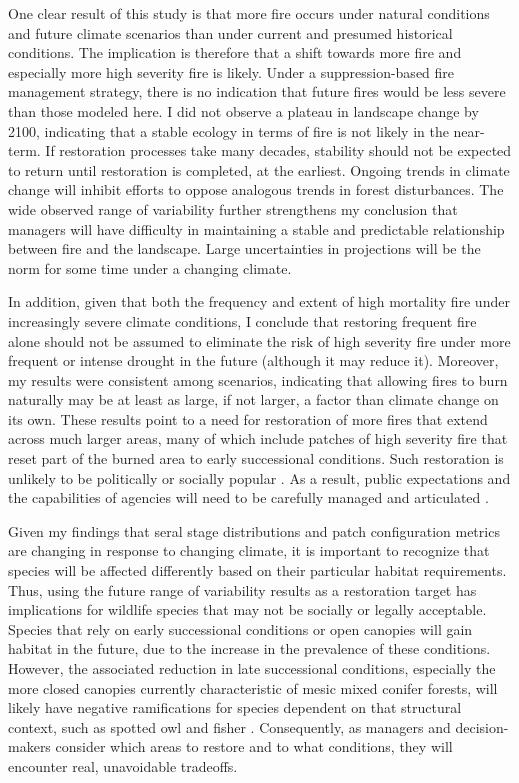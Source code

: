 One clear result of this study is that more fire occurs under natural conditions and future climate scenarios than under current and presumed historical conditions. The implication is therefore that a shift towards more fire and especially more high severity fire is likely. Under a suppression-based fire management strategy, there is no indication that future fires would be less severe than those modeled here. I did not observe a plateau in landscape change by 2100, indicating that a stable ecology in terms of fire is not likely in the near-term. If restoration processes take many decades, stability should not be expected to return until restoration is completed, at the earliest. Ongoing trends in climate change will inhibit efforts to oppose analogous trends in forest disturbances. The wide observed range of variability further strengthens my conclusion that managers will have difficulty in maintaining a stable and predictable relationship between fire and the landscape. Large uncertainties in projections will be the norm for some time under a changing climate. 

In addition, given that both the frequency and extent of high mortality fire under increasingly severe climate conditions, I conclude that restoring frequent fire alone should not be assumed to eliminate the risk of high severity fire under more frequent or intense drought in the future (although it may reduce it). Moreover, my results were consistent among scenarios, indicating that allowing fires to burn naturally may be at least as large, if not larger, a factor than climate change on its own. These results point to a need for restoration of more fires that extend across much larger areas, many of which include patches of high severity fire that reset part of the burned area to early successional conditions. Such restoration is unlikely to be politically or socially popular \citep{Stephens2010,Stephens2013}. As a result, public expectations and the capabilities of agencies will need to be carefully managed and articulated \citep{Keeley2000}. 

Given my findings that seral stage distributions and patch configuration metrics are changing in response to changing climate, it is important to recognize that species will be affected differently based on their particular habitat requirements. Thus, using the future range of variability results as a restoration target has implications for wildlife species that may not be socially or legally acceptable. Species that rely on early successional conditions or open canopies will gain habitat in the future, due to the increase in the prevalence of these conditions. However, the associated reduction in late successional conditions, especially the more closed canopies currently characteristic of mesic mixed conifer forests, will likely have negative ramifications for species dependent on that structural context, such as spotted owl and fisher \citep{SNEP1996b}. Consequently, as managers and decision-makers consider which areas to restore and to what conditions, they will encounter real, unavoidable tradeoffs.

